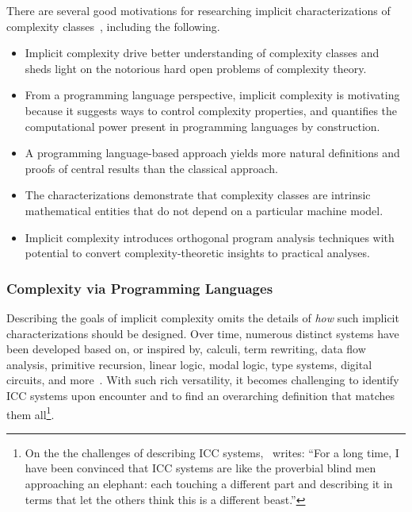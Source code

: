 There are several good motivations for researching implicit characterizations of complexity classes~\cite[p. 36]{kristiansen2017,jones1999}, including the following.
\begin{itemize}

    \item Implicit complexity drive better understanding of complexity classes and sheds light on the notorious hard open problems of complexity theory.

    \item From a programming language perspective, implicit complexity is motivating because it suggests ways to control complexity properties, and quantifies the computational power present in programming languages by construction.

    \item A programming language-based approach yields more {natural definitions and proofs} of central results than the classical approach.

    \item The characterizations demonstrate that complexity classes are intrinsic mathematical entities that do not depend on a particular machine model.

    \item Implicit complexity introduces orthogonal program analysis techniques with potential to convert complexity-theoretic insights to practical analyses.

\end{itemize}

\subsubsection{Complexity via Programming Languages}

Describing the goals of implicit complexity omits the details of \emph{how} such implicit characterizations should be designed.
Over time, numerous distinct systems have been developed based on, or inspired by, \eg
calculi,
term rewriting,
data flow analysis,
primitive recursion,
linear logic,
modal logic,
type systems,
digital circuits, and more~\cite{kristiansen2017,marion2011,moyen2017,baillot2012}.
With such rich versatility, it becomes challenging to identify ICC systems upon encounter and to find an overarching definition that matches them all\footnote{
    On the the challenges of describing ICC systems,~\textcite[p. 14]{moyen2017} writes:
    \enquote{For a long time, I have been convinced that ICC systems are like the proverbial blind men approaching an elephant:
    each touching a different part and describing it in terms that let the others think this is a different beast.}}.

